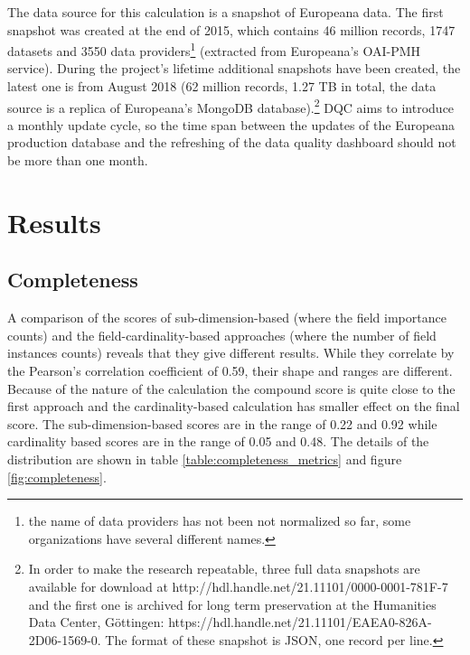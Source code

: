 The data source for this calculation is a snapshot of Europeana data. The first snapshot was created at the end of 2015, which contains 46 million records, 1747 datasets and 3550 data providers\footnote{the name of data providers has not been not normalized so far, some organizations have several different names.} (extracted from Europeana's OAI-PMH service). During the project's lifetime additional snapshots have been created, the latest one is from August 2018 (62 million records, 1.27 TB in total, the data source is a replica of Europeana's MongoDB database).\footnote{In order to make the research repeatable, three full data snapshots are available for download at http://hdl.handle.net/21.11101/0000-0001-781F-7 and the first one is archived for long term preservation at the Humanities Data Center, Göttingen: https://hdl.handle.net/21.11101/EAEA0-826A-2D06-1569-0. The format of these snapshot is JSON, one record per line.} DQC aims to introduce a monthly update cycle, so the time span between the updates of the Europeana production database and the refreshing of the data quality dashboard should not be more than one month.

\section{Results}

\subsection{Completeness}

A comparison of the scores of sub-dimension-based (where the field importance counts) and the field-cardinality-based approaches (where the number of field instances counts) reveals that they give different results. While they correlate by the Pearson's correlation coefficient of 0.59, their shape and ranges are different. Because of the nature of the calculation the compound score is quite close to the first approach and the cardinality-based calculation has smaller effect on the final score. The sub-dimension-based scores are in the range of 0.22 and 0.92 while cardinality based scores are in the range of 0.05 and 0.48. The details of the distribution are shown in table \ref{table:completeness_metrics} and figure \ref{fig:completeness}.

